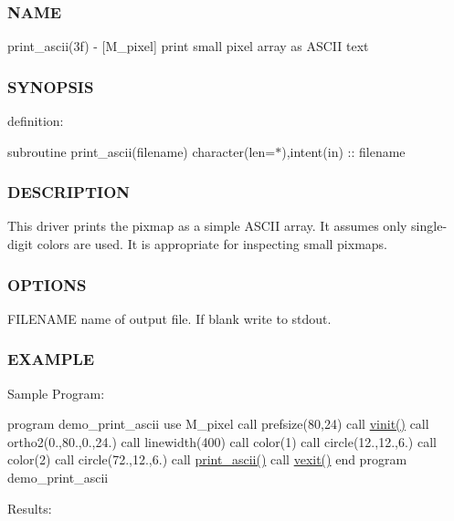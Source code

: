 \subsubsection*{N\+A\+ME}

print\+\_\+ascii(3f) -\/ \mbox{[}M\+\_\+pixel\mbox{]} print small pixel array as A\+S\+C\+II text 

\subsubsection*{S\+Y\+N\+O\+P\+S\+IS}

definition\+:

subroutine print\+\_\+ascii(filename) character(len=$\ast$),intent(in) \+:\+: filename

\subsubsection*{D\+E\+S\+C\+R\+I\+P\+T\+I\+ON}

This driver prints the pixmap as a simple A\+S\+C\+II array. It assumes only single-\/digit colors are used. It is appropriate for inspecting small pixmaps.

\subsubsection*{O\+P\+T\+I\+O\+NS}

F\+I\+L\+E\+N\+A\+ME name of output file. If blank write to stdout.

\subsubsection*{E\+X\+A\+M\+P\+LE}

Sample Program\+:

program demo\+\_\+print\+\_\+ascii use M\+\_\+pixel call prefsize(80,24) call \hyperlink{namespacem__pixel_ac03ca8f23fdadb60599b6ea4dc87a6d9}{vinit()} call ortho2(0.,80.,0.,24.) call linewidth(400) call color(1) call circle(12.,12.,6.) call color(2) call circle(72.,12.,6.) call \hyperlink{namespacem__pixel_ab2bb47aea567667b1b92c8265bcb36fb}{print\+\_\+ascii()} call \hyperlink{namespacem__pixel_a19ad6b65752322b0029a62cc0ebec3e8}{vexit()} end program demo\+\_\+print\+\_\+ascii

Results\+:

